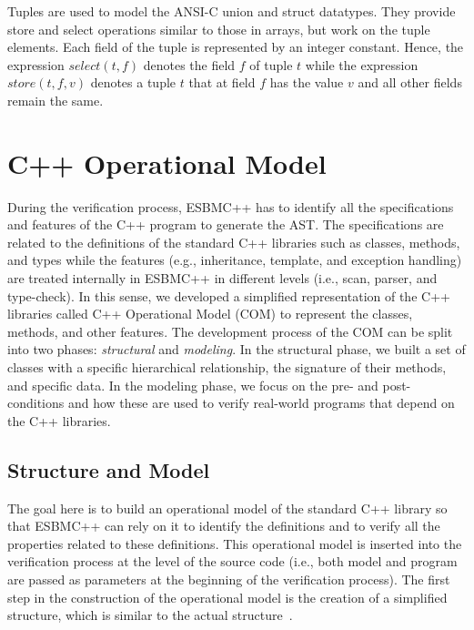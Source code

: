 \documentclass[a4paper]{llncs}
\begin{document}
\noindent
Tuples are used to model the ANSI-C union and struct datatypes. They provide
\mbox{store} and \mbox{select} operations similar to those in arrays, but work
on the tuple \mbox{elements}. Each field of the tuple is represented by an
integer constant. Hence, the expression $\mathit{select}(t, f)$ denotes the field $f$
of tuple $t$ while the expression $\mathit{store}(t, f, v)$ denotes a tuple $t$
that at field $f$ has the value $v$ and all other fields remain the
same.

\section{C++ Operational Model}

During the verification process, ESBMC++ has to identify all the 
specifications and features of the C++ program to generate the AST. 
The specifications are related to the definitions of the standard C++ 
libraries such as classes, methods, and types while the features 
(e.g., inheritance, template, and exception handling) are treated internally 
in ESBMC++ in different levels (i.e., scan, parser, and type-check).
In this sense, we developed a simplified representation of the C++ libraries 
called C++ Operational Model (COM) to represent the classes, methods, 
and other features. The development process of the COM can be split into 
two phases: \textit{structural} and \textit{modeling}. In the structural phase, 
we built a set of classes with a specific hierarchical relationship, the signature 
of their methods, and specific data. In the modeling phase, we focus on the pre-
and post-conditions and how these are used to verify real-world programs that 
depend on the C++ libraries.

\subsection{Structure and Model}

The goal here is to build an operational model of the standard C++ library 
so that ESBMC++ can rely on it to identify the definitions and to verify all 
the properties related to these definitions. This operational model is inserted 
into the verification process at the level of the source code (i.e., both model and 
program are passed as parameters at the beginning of the verification process).
The first step in the construction of the operational model is the creation 
of a simplified structure, which is similar to the actual structure~\cite{CppReference12}. 
\end{document}
